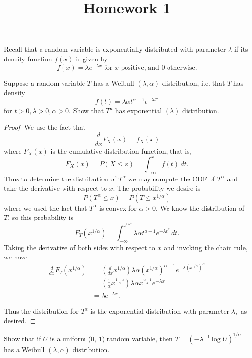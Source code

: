 \documentclass{article}
\begin{document}
\title{Homework 1}
\maketitle
\thispagestyle{fancy}

\begin{enumerate}

		\ii Recall that a random variable is exponentially distributed with parameter $\lambda$ if its density function $f(x)$ is given by \[f(x) = \lambda e^{-\lambda x} \text{ for } x\text{ positive, and 0 otherwise.} \]
			
		\begin{enumerate}[(a)]
				\ii Suppose a random variable $T$ has a Weibull $(\lambda, \alpha)$ distribution, i.e. that $T$ has density \[f(t) = \lambda\alpha t^{\alpha-1}e^{-\lambda t^{\alpha}}\] for $t>0, \lambda>0, \alpha>0.$ Show that $T^{a}$ has exponential $(\lambda)$ distribution.
				\begin{proof}
					We use the fact that \[\frac{d}{dx}F_X(x) = f_X(x)\] where $F_X(x)$ is the cumulative distribution function, that is, \[F_X(x) = P(X\le x) = \int_{-\infty}^x f(t)\, dt.\] Thus to determine the distribution of $T^\alpha$ we may compute the CDF of $T^\alpha$ and take the derivative with respect to $x.$ 
					The probability we desire is \[P(T^\alpha\le x) = P(T\le x^{1/\alpha})\] where we used the fact that $T^\alpha$ is convex for $\alpha>0.$ We know the distribution of $T$, so this probability is \[F_T(x^{1/\alpha}) = \int_{-\infty}^{x^{1/\alpha}} \lambda\alpha t^{\alpha-1}e^{-\lambda t^{\alpha}}\, dt.\] Taking the derivative of both sides with respect to $x$ and invoking the chain rule, we have \begin{align*}
						\frac{d}{dx}F_T(x^{1/\alpha}) &= \left( \frac{d}{dx}x^{1/\alpha} \right) \lambda\alpha (x^{1/\alpha})^{\alpha-1}e^{-\lambda (x^{1/\alpha})^{\alpha}} \\
						&= \left(\frac{1}{\alpha}x^{\frac{1-\alpha}{\alpha}} \right) \lambda\alpha x^{\frac{\alpha-1}{\alpha}}e^{-\lambda x} \\
						&= \lambda e^{-\lambda x}.
					\end{align*}

					Thus the distribution for $T^\alpha$ is the exponential distribution with parameter $\lambda,$ as desired.
				\end{proof}

				\newpage

				\ii Show that if $U$ is a uniform (0, 1) random variable, then $T=(-\lambda^{-1} \log U)^{1/\alpha}$ has a Weibull $(\lambda, \alpha)$ distribution.


\end{enumerate}
\end{enumerate}
\end{document}
